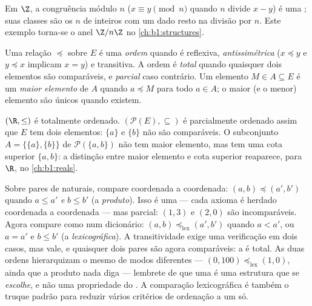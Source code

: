 \begin{example}\label{ex:b1:logic:congruence}
Em $\Z$, a congruência módulo $n$ ($x \equiv y \pmod n$ quando $n$ divide
$x - y$) é uma ; suas classes são os $n$ 
de inteiros com um dado resto na divisão por $n$. Este exemplo
torna-se o anel $\Z/n\Z$ no \cref{ch:b1:structures}.
\end{example}

\begin{definition}\label{def:b1:logic:order}
Uma relação $\preceq$ sobre $E$ é uma \emph{ordem}
quando é reflexiva, \emph{antissimétrica} ($x \preceq y$ e $y
\preceq x$ implicam $x = y$) e transitiva. A ordem é \emph{total}
quando quaisquer dois elementos são comparáveis, e \emph{parcial} caso
contrário. Um elemento $M \in A \subseteq E$ é um \emph{maior elemento} de $A$
quando $a \preceq M$ para todo $a \in A$; o maior (e o menor) elemento são
únicos quando existem.
\end{definition}

\begin{example}\label{ex:b1:logic:orders}
$(\R, \leq)$ é totalmente ordenado. $(\mathcal{P}(E), \subseteq)$ é
parcialmente ordenado assim que $E$ tem dois elementos: $\{a\}$ e
$\{b\}$ não são comparáveis. O subconjunto $A = \{\{a\}, \{b\}\}$ de
$\mathcal{P}(\{a,b\})$ não tem maior elemento, mas tem uma cota superior
$\{a, b\}$: a distinção entre maior elemento e cota superior
reaparece, para $\R$, no \cref{ch:b1:reals}.
\end{example}

\begin{example}\label{ex:b1:logic:lexorder}
Sobre pares de naturais, compare coordenada a coordenada: $(a, b) \preceq (a',
b')$ quando $a \leq a'$ \emph{e} $b \leq b'$ (a \emph{
produto}). Isso é uma  --- cada axioma é herdado coordenada a
coordenada --- mas parcial: $(1, 3)$ e $(2, 0)$ são incomparáveis. Agora
compare como num dicionário: $(a, b)
\preceq_{\mathrm{lex}} (a', b')$ quando $a < a'$, ou $a = a'$ e $b
\leq b'$ (a \emph{ lexicográfica}). A transitividade exige uma
verificação em dois casos, mas vale, e quaisquer dois pares são agora
comparáveis: a  é total. As duas ordens hierarquizam o mesmo
 de modos diferentes --- $(0, 100) \preceq_{\mathrm{lex}} (1, 0)$, ainda que a 
produto nada diga --- lembrete de que uma  é uma estrutura que se
\emph{escolhe}, e não uma propriedade do . A comparação
lexicográfica é também o truque padrão para reduzir vários critérios de
ordenação a um só.
\end{example}

